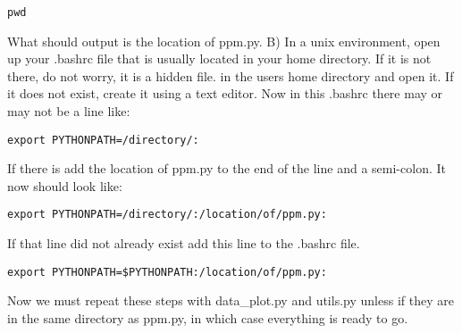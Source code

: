 \begin{verbatim}
pwd
\end{verbatim}

What should output is the location of ppm.py.
\newline
B) In a unix environment, open up your .bashrc file that is usually located in your home directory.  If it is not there, do not worry, it is a hidden file.
in the users home directory and open it.  If it does not exist, create it using a text editor.
Now in this .bashrc there may or may not be a line like:

\begin{verbatim}
export PYTHONPATH=/directory/:
\end{verbatim}

If there is add the location of ppm.py to the end of the line and a semi-colon.  It now should look like:

\begin{verbatim}
export PYTHONPATH=/directory/:/location/of/ppm.py:
\end{verbatim}

If that line did not already exist add this line to the .bashrc file.

\begin{verbatim}
export PYTHONPATH=$PYTHONPATH:/location/of/ppm.py:
\end{verbatim}

Now we must repeat these steps with data\_plot.py and utils.py unless if they are in the same directory as ppm.py, in which case everything is ready to go.


